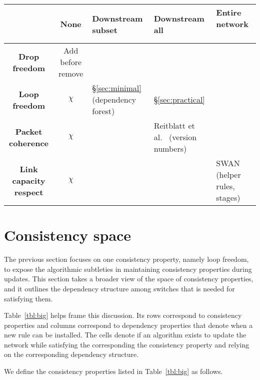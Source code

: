 \begin{table*}[t!]
\begin{center}
\begin{tabular}{c|c|p{1in}|p{1in}|p{1in}|}
&
  \textbf{None}
&
  \textbf{Downstream subset}
&
  \textbf{Downstream all}
&
  \textbf{Entire network}
\ \\ \hline

  \textbf{Drop freedom}
&
  Add before remove
&
&
&
\ \\ \hline

  \textbf{Loop freedom}
&
  $\chi$
&
  \S\ref{sec:minimal} (dependency forest)
&
  \S\ref{sec:practical}
&
\ \\ \hline

  \textbf{Packet coherence}
&
  $\chi$
&
&
  Reitblatt et al.~\cite{safeupdate} (version numbers)
&
\ \\ \hline

  \textbf{Link capacity respect}
&
  $\chi$
&
&
&
  SWAN~\cite{swan} (helper rules, stages)
\ \\ \hline
\end{tabular}
\end{center}
\caption{something}
\label{tbl:big}
\end{table*} 


\section{Consistency space}
\label{sec:table}

The previous section focuses on one consistency property, namely loop freedom, to expose the algorithmic subtleties in maintaining consistency properties during updates. This section takes a broader view of the space of consistency properties, and it outlines the dependency structure among switches that is needed for satisfying them.

Table~\ref{tbl:big} helps frame this discussion. Its rows correspond to consistency properties and columns correspond to dependency properties that denote when a new rule can be installed. The cells denote if an algorithm exists to update the network while satisfying the corresponding the consistency property and relying on the corresponding dependency structure.

We define the consistency properties listed in Table~\ref{tbl:big} as follows.

